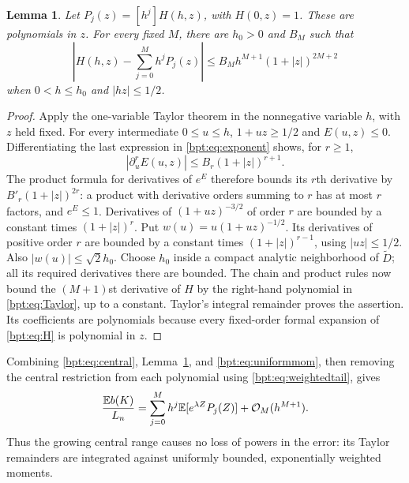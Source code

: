 \documentclass[11pt]{article}
\newtheorem{lemma}[theorem]{Lemma}
\theoremstyle{remark}\newtheorem{remark}[theorem]{Remark}
\newcommand{\E}{\mathbb E}\newcommand{\Prb}{\mathbb P}
\begin{document}
\begin{lemma}\label{bpt:lem:Taylor}
Let $P_j(z)=[h^j]H(h,z)$, with $H(0,z)=1$. These are polynomials in $z$.
For every fixed $M$, there are $h_0>0$ and $B_M$ such that
\begin{equation}\label{bpt:eq:Taylor}
 \left|H(h,z)-\sum_{j=0}^M h^jP_j(z)\right|
 \le B_Mh^{M+1}(1+|z|)^{2M+2}
\end{equation}
when $0<h\le h_0$ and $|hz|\le1/2$.
\end{lemma}
\begin{proof}
Apply the one-variable Taylor theorem in the nonnegative variable $h$, with $z$ held fixed. For every intermediate $0\le u\le h$,
$1+uz\ge1/2$ and $E(u,z)\le0$. Differentiating the last expression in \eqref{bpt:eq:exponent} shows, for $r\ge1$,
\[
 |\partial_u^r E(u,z)|\le B_r(1+|z|)^{r+1}.
\]
The product formula for derivatives of $e^E$ therefore bounds its $r$th derivative by $B'_r(1+|z|)^{2r}$: a product with derivative orders summing to $r$ has at most $r$ factors, and $e^E\le1$.
Derivatives of $(1+uz)^{-3/2}$ of order $r$ are bounded by a constant times $(1+|z|)^r$.
Put $w(u)=u(1+uz)^{-1/2}$. Its derivatives of positive order $r$ are bounded by a constant times $(1+|z|)^{r-1}$, using $|uz|\le1/2$. Also $|w(u)|\le\sqrt2h_0$.
Choose $h_0$ inside a compact analytic neighborhood of $\widetilde D$; all its required derivatives there are bounded. The chain and product rules now bound the $(M+1)$st derivative of $H$ by the right-hand polynomial in \eqref{bpt:eq:Taylor}, up to a constant. Taylor's integral remainder proves the assertion. Its coefficients are polynomials because every fixed-order formal expansion of \eqref{bpt:eq:H} is polynomial in $z$.
\end{proof}

Combining \eqref{bpt:eq:central}, Lemma~\ref{bpt:lem:Taylor}, and \eqref{bpt:eq:uniformmom}, then removing the central restriction from each polynomial using \eqref{bpt:eq:weightedtail}, gives
\begin{equation}\label{bpt:eq:expectP}
 \frac{\E b(K)}{L_n}
 =\sum_{j=0}^M h^j\E[e^{\lambda Z}P_j(Z)]
      +\OO_M(h^{M+1}).
\end{equation}
Thus the growing central range causes no loss of powers in the error: its Taylor remainders are integrated against uniformly bounded, exponentially weighted moments.
\end{document}
